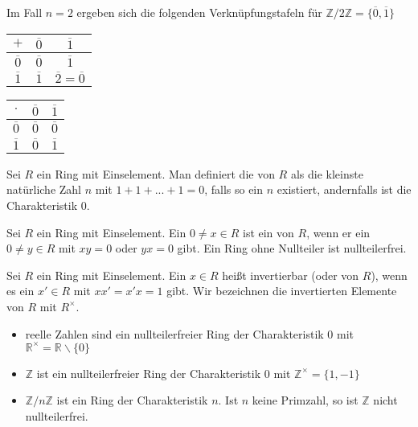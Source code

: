 \begin{example}
	Im Fall $n=2$ ergeben sich die folgenden Verknüpfungstafeln für $\mathbb{Z}
	/2\mathbb{Z} = \{\overline{0}, \overline{1}\}$ \\
	\begin{center}
		\begin{tabular}{|c|c|c|}
			\hline
			$+$ & $\overline{0}$ & $\overline{1}$\\
			\hline
			$\overline{0}$ & $\overline{0}$ & $\overline{1}$\\
			\hline
			$\overline{1}$ & $\overline{1}$ & $\overline{2}=\overline{0}$ \\
			\hline
		\end{tabular}
	\end{center}
	\begin{center}
		\begin{tabular}{|c|c|c|}
			\hline
			$\cdot$ & $\overline{0}$ & $\overline{1}$\\
			\hline
			$\overline{0}$ & $\overline{0}$ & $\overline{0}$\\
			\hline
			$\overline{1}$ & $\overline{0}$ & $\overline{1}$ \\
			\hline
		\end{tabular}
	\end{center}
\end{example}

\begin{definition}[Charakteristik]
	Sei $R$ ein Ring mit Einselement. Man definiert die  von
	$R$ als die kleinste natürliche Zahl $n$ mit $1+1+...+1=0$, falls so ein $n$ existiert, andernfalls
	ist die Charakteristik $0$.
\end{definition}

\begin{definition}[Nullteiler]
	Sei $R$ ein Ring mit Einselement. Ein $0 \neq x \in R$ ist ein  von 
	$R$, wenn er ein $0 \neq y \in R$ mit $xy=0$ oder $yx=0$ gibt. Ein Ring ohne Nullteiler ist
	nullteilerfrei.
\end{definition}

\begin{definition}[Einheit]
	Sei $R$ ein Ring mit Einselement. Ein $x \in R$ heißt invertierbar (oder
	 von $R$), wenn es ein $x' \in R$ mit $xx'=x'x=1$ gibt. Wir bezeichnen die invertierten
	Elemente von $R$ mit $R^{\times}$.
\end{definition}

\begin{example}
	\begin{itemize}
		\item reelle Zahlen sind ein nullteilerfreier Ring der Charakteristik $0$ mit $\mathbb R^{\times}=
		\mathbb R\backslash\{0\}$
		\item $\mathbb Z$ ist ein nullteilerfreier Ring der Charakteristik $0$ mit $\mathbb Z^{\times}=
		\{1,-1\}$
		\item $\mathbb Z/n \mathbb Z$ ist ein Ring der Charakteristik $n$. Ist $n$ keine Primzahl, so
		ist $\mathbb Z$ nicht nullteilerfrei.
	\end{itemize}
\end{example}

